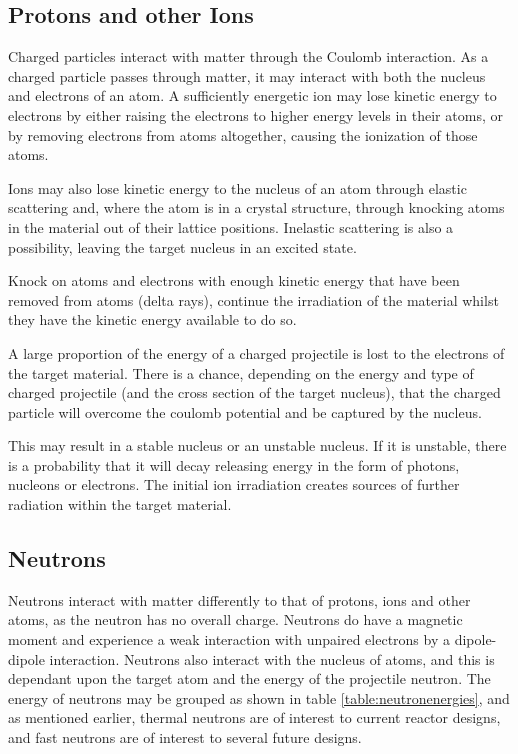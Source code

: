 \subsection{Protons and other Ions}

Charged particles interact with matter through the Coulomb interaction.  As a charged particle passes through matter, it may interact with both the nucleus and electrons of an atom.  A sufficiently energetic ion may lose kinetic energy to electrons by either raising the electrons to higher energy levels in their atoms, or by removing electrons from atoms altogether, causing the ionization of those atoms.  

Ions may also lose kinetic energy to the nucleus of an atom through elastic scattering and, where the atom is in a crystal structure, through knocking atoms in the material out of their lattice positions.  Inelastic scattering is also a possibility, leaving the target nucleus in an excited state.

Knock on atoms and electrons with enough kinetic energy that have been removed from atoms (delta rays), continue the irradiation of the material whilst they have the kinetic energy available to do so.

A large proportion of the energy of a charged projectile is lost to the electrons of the target material.  There is a chance, depending on the energy and type of charged projectile (and the cross section of the target nucleus), that the charged particle will overcome the coulomb potential and be captured by the nucleus.

This may result in a stable nucleus or an unstable nucleus.  If it is unstable, there is a probability that it will decay releasing energy in the form of photons, nucleons or electrons.  The initial ion irradiation creates sources of further radiation within the target material.



\FloatBarrier
\subsection{Neutrons}


Neutrons interact with matter differently to that of protons, ions and other atoms, as the neutron has no overall charge.  Neutrons do have a magnetic moment and experience a weak interaction with unpaired electrons by a dipole-dipole interaction.  Neutrons also interact with the nucleus of atoms, and this is dependant upon the target atom and the energy of the projectile neutron.  The energy of neutrons may be grouped as shown in table \ref{table:neutronenergies}, and as mentioned earlier, thermal neutrons are of interest to current reactor designs, and fast neutrons are of interest to several future designs.
 
